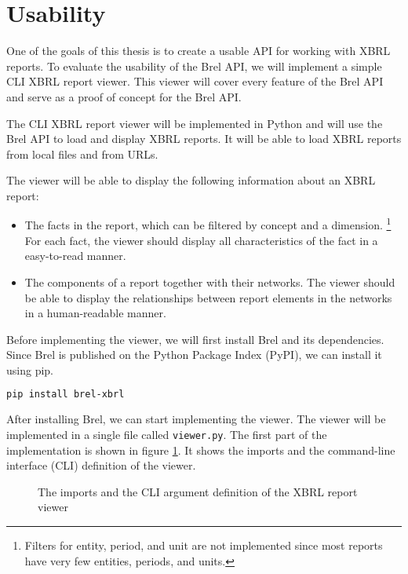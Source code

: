 \section{Usability}
\label{sec:usability}

One of the goals of this thesis is to create a usable API for working with XBRL reports.
To evaluate the usability of the Brel API, we will implement a simple CLI XBRL report viewer.
This viewer will cover every feature of the Brel API and serve as a proof of concept for the Brel API.

The CLI XBRL report viewer will be implemented in Python and will use the Brel API to load and display XBRL reports.
It will be able to load XBRL reports from local files and from URLs.

The viewer will be able to display the following information about an XBRL report:

\begin{itemize}
    \item The facts in the report, which can be filtered by concept and a dimension.
    \footnote{Filters for entity, period, and unit are not implemented since most reports have very few entities, periods, and units.}
    For each fact, the viewer should display all characteristics of the fact in a easy-to-read manner.
    \item The components of a report together with their networks.
    The viewer should be able to display the relationships between report elements in the networks in a human-readable manner.
\end{itemize}

Before implementing the viewer, we will first install Brel and its dependencies.
Since Brel is published on the Python Package Index (PyPI), we can install it using pip.

\begin{lstlisting}[language=bash]
pip install brel-xbrl
\end{lstlisting}

After installing Brel, we can start implementing the viewer.
The viewer will be implemented in a single file called \texttt{viewer.py}.
The first part of the implementation is shown in figure \ref{fig:viewer_1}.
It shows the imports and the command-line interface (CLI) definition of the viewer.

\begin{figure}[H]
    \centering
    \caption{The imports and the CLI argument definition of the XBRL report viewer}
    
    \label{fig:viewer_1}
\end{figure}

